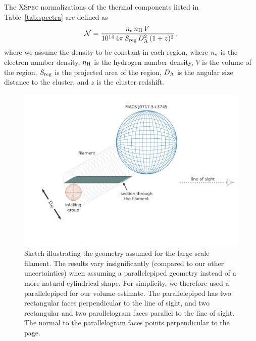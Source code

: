 The \textsc{XSpec} normalizations of the thermal components listed in Table~\ref{tab:spectra} are defined as
\begin{equation}
	\mathcal{N} = \frac{n_{\rm e} \, n_{\rm H} \, V}{10^{14} \, 4\pi \, S_{\rm reg} \, D_{\rm A}^2 \, (1+z)^2} \, , 
\label{eq:norm}
\end{equation}
where we assume the density to be constant in each region, where $n_{\rm e}$ is the electron number density, $n_{\rm H}$ is the hydrogen number density, $V$ is the volume of the region, $S_{\rm reg}$ is the projected area of the region, $D_{\rm A}$ is the angular size distance to the cluster, and $z$ is the cluster redshift.

\begin{figure}
	\includegraphics[width=\columnwidth, trim=0 2.5cm 0 1cm, clip=True]{plots/fil-macsj0717-sketch.pdf}
	\caption{Sketch illustrating the geometry assumed for the large scale filament. The results vary insignificantly (compared to our other uncertainties) when assuming a parallelepiped geometry instead of a more natural cylindrical shape. For simplicity, we therefore used a parallelepiped for our volume estimate. The parallelepiped has two rectangular faces perpendicular to the line of sight, and two rectangular and two parallelogram faces parallel to the line of sight. The normal to the parallelogram faces points perpendicular to the page.  \label{fig:sketch}}
\end{figure}

